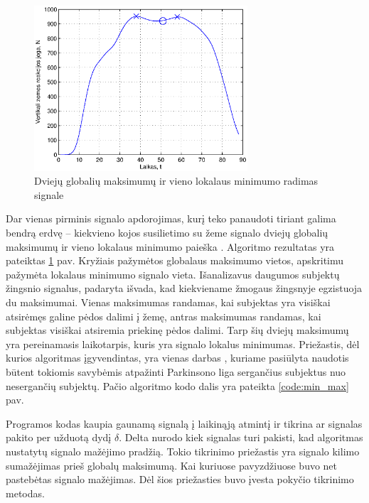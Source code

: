 \documentclass[]{vgtuef}
\begin{document}
\begin{figure}[!t]
  \centering
 \includegraphics[width=300px]{figures/10_global_max_local_min.eps}
  \caption{Dviejų globalių maksimumų ir vieno lokalaus minimumo radimas signale}
  \label{fig:min_max}
\end{figure}



Dar vienas pirminis signalo apdorojimas, kurį teko panaudoti tiriant galima bendrą erdvę -- kiekvieno kojos susilietimo su žeme signalo dviejų globalių maksimumų ir vieno lokalaus minimumo paieška \cite{6151536}. Algoritmo rezultatas yra pateiktas \ref{fig:min_max} pav. Kryžiais pažymėtos globalaus maksimumo vietos, apskritimu pažymėta lokalaus minimumo signalo vieta. Išanalizavus daugumos subjektų žingsnio signalus, padaryta išvada, kad kiekviename žmogaus žingsnyje egzistuoja du maksimumai. Vienas maksimumas randamas, kai subjektas yra visiškai atsirėmęs galine pėdos dalimi į žemę, antras maksimumas randamas, kai subjektas visiškai atsiremia priekinę pėdos dalimi. Tarp šių dviejų maksimumų yra pereinamasis laikotarpis, kuris yra signalo lokalus minimumas. Priežastis, dėl kurios algoritmas įgyvendintas, yra vienas darbas \cite{6151536}, kuriame pasiūlyta naudotis būtent tokiomis savybėmis atpažinti Parkinsono liga sergančius subjektus nuo nesergančių subjektų. Pačio algoritmo kodo dalis yra pateikta \ref{code:min_max} pav.

\begin{cfigure}[!t]
  \centering
  \caption{Dviejų globalių maksimumų ir vieno lokalaus minimumo radimo algoritmo fragmentas}
  \label{code:min_max}
  
\end{cfigure}

Programos kodas kaupia gaunamą signalą į laikinąją atmintį ir tikrina ar signalas pakito per užduotą dydį $\delta$. Delta nurodo kiek signalas turi pakisti, kad algoritmas nustatytų signalo mažėjimo pradžią. Tokio tikrinimo priežastis yra signalo kilimo sumažėjimas prieš globalų maksimumą. Kai kuriuose pavyzdžiuose buvo net pastebėtas signalo mažėjimas. Dėl šios priežasties buvo įvesta pokyčio tikrinimo metodas.
\end{document}
